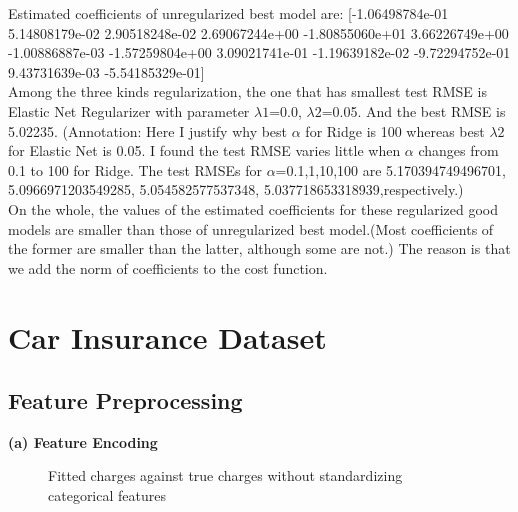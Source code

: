 \documentclass{article}
\begin{document}
Estimated coefficients of unregularized best model are:  [-1.06498784e-01  5.14808179e-02 2.90518248e-02  2.69067244e+00 -1.80855060e+01  3.66226749e+00 -1.00886887e-03 -1.57259804e+00 3.09021741e-01 -1.19639182e-02 -9.72294752e-01  9.43731639e-03 -5.54185329e-01]\\

Among the three kinds regularization, the one that has smallest test RMSE is Elastic Net Regularizer with parameter $\lambda1$=0.0, $\lambda2$=0.05. And the best RMSE is 5.02235.
(Annotation: Here I justify why best $\alpha$ for Ridge is 100 whereas best $\lambda2$ for Elastic Net is 0.05. I found the test RMSE varies little when $\alpha$ changes from 0.1 to 100 for Ridge. The test RMSEs for $\alpha$=0.1,1,10,100 are 5.170394749496701, 5.0966971203549285, 5.054582577537348, 5.037718653318939,respectively.)\\

On the whole, the values of the estimated coefficients for these regularized good models are smaller than those of unregularized best model.(Most coefficients of the former are smaller than the latter, although some are not.) The reason is that we add the norm of coefficients to the cost function.



\newpage

\section{Car Insurance Dataset}
\subsection{Feature Preprocessing}

\noindent \textbf{(a) Feature Encoding} \bigbreak

\begin{figure}[!htbp]
\centering
{}
\caption{Fitted charges against true charges without standardizing categorical features} \label{3_1_a_1}
\end{figure}
\end{document}
